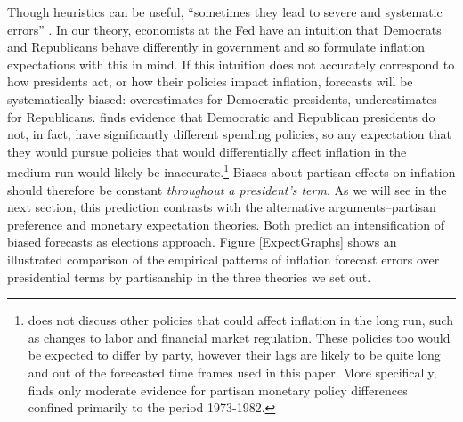 \documentclass[a4paper]{article}\usepackage[]{graphicx}\usepackage[]{color}
\begin{document}
Though heuristics can be useful, ``sometimes they lead to severe and systematic errors'' \citep[][1124]{tverskykahneman1974}. In our theory, economists at the Fed have an intuition that Democrats and Republicans behave differently in government and so formulate inflation expectations with this in mind. If this intuition does not accurately correspond to how presidents act, or how their policies impact inflation, forecasts will be systematically biased: overestimates for Democratic presidents, underestimates for Republicans. \cite{Bartels2008} finds evidence that Democratic and Republican presidents do not, in fact, have significantly different spending policies, so any expectation that they would pursue policies that would differentially affect inflation in the medium-run would likely be inaccurate.\footnote{\cite{Bartels2008} does not discuss other policies that could affect inflation in the long run, such as changes to labor and financial market regulation. These policies too would be expected to differ by party, however their lags are likely to be quite long and out of the forecasted time frames used in this paper. More specifically, \cite{Franzese2002} finds only moderate evidence for partisan monetary policy differences confined primarily to the period 1973-1982.} Biases about partisan effects on inflation should therefore be constant {\emph{throughout a president's term}}. As we will see in the next section, this prediction contrasts with the alternative arguments--partisan preference and monetary expectation theories. Both predict an intensification of biased forecasts as elections approach. Figure \ref{ExpectGraphs} shows an illustrated comparison of the empirical patterns of inflation forecast errors over presidential terms by partisanship in the three theories we set out.
\end{document}
